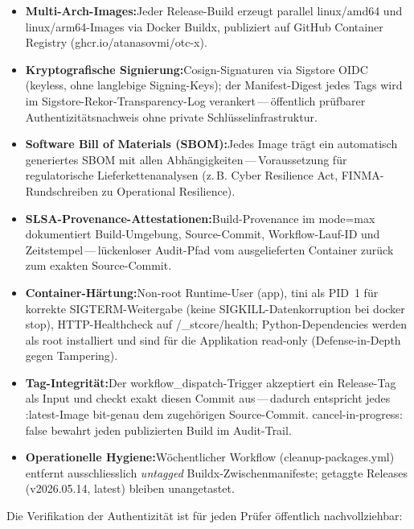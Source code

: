 \documentclass[11pt, a4paper, oneside, openany]{report}
\newcommand{\code}[1]{{\codefont\small\textcolor{DeepNavy}{#1}}}
\begin{document}
\begin{infobox}
\begin{itemize}
  \item \textbf{Multi-Arch-Images:}\;Jeder Release-Build erzeugt parallel \code{linux/amd64} und \code{linux/arm64}-Images via Docker Buildx, publiziert auf GitHub Container Registry (\code{ghcr.io/atanasovmi/otc-x}).
  \item \textbf{Kryptografische Signierung:}\;Cosign-Signaturen via Sigstore OIDC (keyless, ohne langlebige Signing-Keys); der Manifest-Digest jedes Tags wird im Sigstore-Rekor-Transparency-Log verankert\,---\,öffentlich prüfbarer Authentizitätsnachweis ohne private Schlüsselinfrastruktur.
  \item \textbf{Software Bill of Materials (SBOM):}\;Jedes Image trägt ein automatisch generiertes SBOM mit allen Abhängigkeiten\,---\,Voraussetzung für regulatorische Lieferkettenanalysen (z.\,B. Cyber Resilience Act, FINMA-Rundschreiben zu Operational Resilience).
  \item \textbf{SLSA-Provenance-Attestationen:}\;Build-Provenance im \code{mode=max} dokumentiert Build-Umgebung, Source-Commit, Workflow-Lauf-ID und Zeitstempel\,---\,lückenloser Audit-Pfad vom ausgelieferten Container zurück zum exakten Source-Commit.
  \item \textbf{Container-Härtung:}\;Non-root Runtime-User (\code{app}), \code{tini} als PID~1 für korrekte SIGTERM-Weitergabe (keine SIGKILL-Datenkorruption bei \code{docker stop}), HTTP-Healthcheck auf \code{/\_stcore/health}; Python-Dependencies werden als root installiert und sind für die Applikation read-only (Defense-in-Depth gegen Tampering).
  \item \textbf{Tag-Integrität:}\;Der \code{workflow\_dispatch}-Trigger akzeptiert ein Release-Tag als Input und checkt exakt diesen Commit aus\,---\,dadurch entspricht jedes \code{:latest}-Image bit-genau dem zugehörigen Source-Commit. \code{cancel-in-progress: false} bewahrt jeden publizierten Build im Audit-Trail.
  \item \textbf{Operationelle Hygiene:}\;Wöchentlicher Workflow (\code{cleanup-packages.yml}) entfernt ausschliesslich \textit{untagged} Buildx-Zwischenmanifeste; getaggte Releases (\code{v2026.05.14}, \code{latest}) bleiben unangetastet.
\end{itemize}
\end{infobox}

\noindent Die Verifikation der Authentizität ist für jeden Prüfer öffentlich nachvollziehbar:
\end{document}
